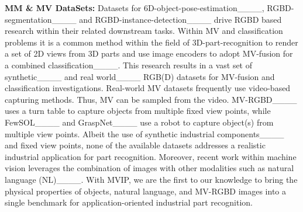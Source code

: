 \textbf{MM \& MV DataSets:} Datasets for 6D-object-pose-estimation____, RGBD-segmentation____ and RGBD-instance-detection____ drive RGBD based research within their related downstream tasks. Within MV and classification problems it is a common method within the field of 3D-part-recognition to render a set of 2D views from 3D parts and use image encoders to adopt MV-fusion for a combined classification____. This research results in a vast set of synthetic____ and real world____ RGB(D) datasets for MV-fusion and classification investigations. Real-world MV datasets frequently use video-based capturing methods. Thus, MV can be sampled from the video. MV-RGBD____ uses a turn table to capture objects from multiple fixed view points, while FewSOL____ and GraspNet____ use a robot to capture object(s) from multiple view points. Albeit the use of synthetic industrial components____ and fixed view points, none of the available datasets addresses a realistic industrial application for part recognition. Moreover, recent work within machine vision leverages the combination of images with other modalities such as natural language (NL)____. With MVIP, we are the first to our knowledge to bring the physical properties of objects, natural language, and MV-RGBD images into a single benchmark for application-oriented industrial part recognition.